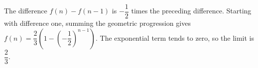 The difference $f(n)-f(n-1)$ is $-\dfrac{1}{2}$ times the preceding difference. Starting with difference one, summing the geometric progression gives $f(n)=\dfrac{2}{3}\left(1-(-\dfrac{1}{2})^{n-1}\right)$. The exponential term tends to zero, so the limit is $\boxed{\dfrac{2}{3}}$.
